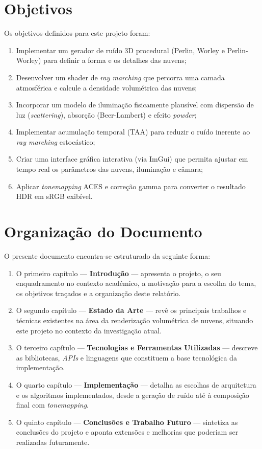 \section{Objetivos}
\label{sec:obj}

Os objetivos definidos para este projeto foram:

\begin{enumerate}
    \item Implementar um gerador de ruído 3D procedural (Perlin, Worley e Perlin-Worley) para definir a forma e os detalhes das nuvens;
    \item Desenvolver um shader de \emph{ray marching} que percorra uma camada atmosférica e calcule a densidade volumétrica das nuvens;
    \item Incorporar um modelo de iluminação fisicamente plausível com dispersão de luz (\emph{scattering}), absorção (Beer-Lambert) e efeito \emph{powder};
    \item Implementar acumulação temporal (\ac{TAA}) para reduzir o ruído inerente ao \emph{ray marching} estocástico;
    \item Criar uma interface gráfica interativa (via ImGui) que permita ajustar em tempo real os parâmetros das nuvens, iluminação e câmara;
    \item Aplicar \emph{tonemapping} \ac{ACES} e correção gamma para converter o resultado HDR em sRGB exibível.
\end{enumerate}

\section{Organização do Documento}
\label{sec:organ}

O presente documento encontra-se estruturado da seguinte forma:

\begin{enumerate}
    \item O primeiro capítulo --- \textbf{Introdução} --- apresenta o projeto, o seu enquadramento no contexto académico, a motivação para a escolha do tema, os objetivos traçados e a organização deste relatório.
    \item O segundo capítulo --- \textbf{Estado da Arte} --- revê os principais trabalhos e técnicas existentes na área da renderização volumétrica de nuvens, situando este projeto no contexto da investigação atual.
    \item O terceiro capítulo --- \textbf{Tecnologias e Ferramentas Utilizadas} --- descreve as bibliotecas, \emph{APIs} e linguagens que constituem a base tecnológica da implementação.
    \item O quarto capítulo --- \textbf{Implementação} --- detalha as escolhas de arquitetura e os algoritmos implementados, desde a geração de ruído até à composição final com \emph{tonemapping}.
    \item O quinto capítulo --- \textbf{Conclusões e Trabalho Futuro} --- sintetiza as conclusões do projeto e aponta extensões e melhorias que poderiam ser realizadas futuramente.
\end{enumerate}
